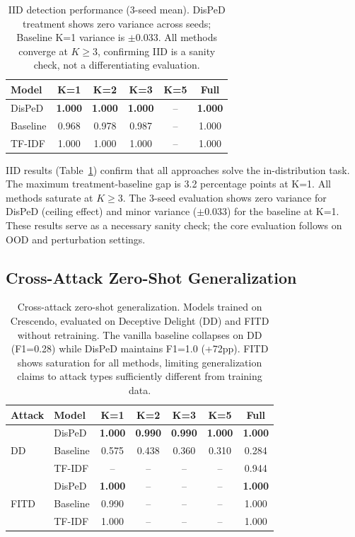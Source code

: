 \documentclass[11pt,a4paper]{article}
\newcommand{\ours}{DisPeD}
\newcommand{\bfres}[1]{\textbf{#1}}
\begin{document}
\begin{table}[t]
\centering
\small
\begin{tabular}{lccccc}
\toprule
\textbf{Model} & \textbf{K=1} & \textbf{K=2} & \textbf{K=3} & \textbf{K=5} & \textbf{Full} \\
\midrule
\ours{} & \bfres{1.000} & \bfres{1.000} & \bfres{1.000} & -- & \bfres{1.000} \\
Baseline & 0.968 & 0.978 & 0.987 & -- & 1.000 \\
TF-IDF & 1.000 & 1.000 & 1.000 & -- & 1.000 \\
\bottomrule
\end{tabular}
\caption{IID detection performance (3-seed mean). \ours{} treatment shows zero variance across seeds; Baseline K=1 variance is $\pm$0.033. All methods converge at $K \geq 3$, confirming IID is a sanity check, not a differentiating evaluation.}
\label{tab:iid}
\end{table}

IID results (Table~\ref{tab:iid}) confirm that all approaches solve the in-distribution task. The maximum treatment-baseline gap is 3.2 percentage points at K=1. All methods saturate at $K \geq 3$. The 3-seed evaluation shows zero variance for \ours{} (ceiling effect) and minor variance ($\pm$0.033) for the baseline at K=1. These results serve as a necessary sanity check; the core evaluation follows on OOD and perturbation settings.


\subsection{Cross-Attack Zero-Shot Generalization}
\label{sec:cross_attack}

\begin{table}[t]
\centering
\small
\begin{tabular}{llccccc}
\toprule
\textbf{Attack} & \textbf{Model} & \textbf{K=1} & \textbf{K=2} & \textbf{K=3} & \textbf{K=5} & \textbf{Full} \\
\midrule
\multirow{3}{*}{DD} & \ours{} & \bfres{1.000} & \bfres{0.990} & \bfres{0.990} & \bfres{1.000} & \bfres{1.000} \\
 & Baseline & 0.575 & 0.438 & 0.360 & 0.310 & 0.284 \\
 & TF-IDF & -- & -- & -- & -- & 0.944 \\
\midrule
\multirow{3}{*}{FITD} & \ours{} & \bfres{1.000} & -- & -- & -- & \bfres{1.000} \\
 & Baseline & 0.990 & -- & -- & -- & 1.000 \\
 & TF-IDF & 1.000 & -- & -- & -- & 1.000 \\
\bottomrule
\end{tabular}
\caption{Cross-attack zero-shot generalization. Models trained on Crescendo, evaluated on Deceptive Delight (DD) and FITD without retraining. The vanilla baseline collapses on DD (F1=0.28) while \ours{} maintains F1=1.0 (+72pp). FITD shows saturation for all methods, limiting generalization claims to attack types sufficiently different from training data.}
\label{tab:cross}
\end{table}
\end{document}
